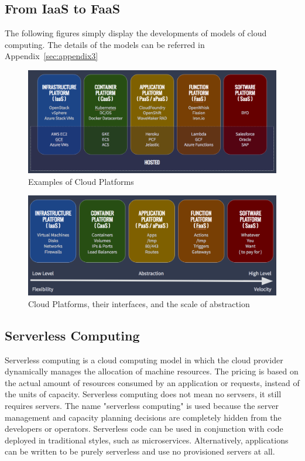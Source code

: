 \documentclass[a4paper,12pt]{article}
\begin{document}
\subsection{From IaaS to FaaS}
The following figures simply display the developments of models of cloud computing\cite{models}. The details of the models can be referred in Appendix~\ref{sec:appendix3}

\begin{figure}[H]
\includegraphics[scale=0.337]{figures/platform-spectrum-small.png}
\caption{Examples of Cloud Platforms}
\end{figure}

\begin{figure}[H]
\includegraphics[scale=0.345]{figures/cloud-platform-abstration.png}
\caption{Cloud Platforms, their interfaces, and the scale of abstraction}
\end{figure}


\subsection{Serverless Computing}
Serverless computing is a cloud computing model in which the cloud provider dynamically manages the allocation of machine resources. The pricing is based on the actual amount of resources consumed by an application or requests, instead of the units of capacity. Serverless computing does not mean no servsers, it still requires servers. The name "serverless computing" is used because the server management and capacity planning decisions are completely hidden from the developers or operators. Serverless code can be used in conjunction with code deployed in traditional styles, such as microservices. Alternatively, applications can be written to be purely serverless and use no provisioned servers at all\cite{serverless}.
\end{document}

